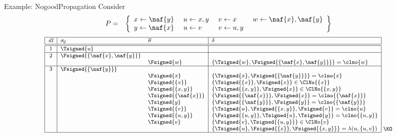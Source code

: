 \begin{frame}{Example: {NogoodPropagation}}
Consider
\begin{eqnarray*}
P
& = &
\left\{
  \begin{array}{l}
x  \leftarrow  \naf{y}\\%
y  \leftarrow  \naf{x}
\end{array}
\
\begin{array}{l}
u  \leftarrow x,y\\%
u  \leftarrow v%
\end{array}
\
\begin{array}{l}
v  \leftarrow x\\%
v  \leftarrow u,y%
\end{array}
\
\begin{array}{l}
w  \leftarrow \naf{x},\naf{y}\\
\mbox{~}
\end{array}
\right\}
\end{eqnarray*}
%
\[
\footnotesize
\begin{array}[b]{|c|ll|l|}
\hline
\mathit{dl}& \sigma_{\!d} & \overline{\sigma} & \delta
\\\hline\hline
1 & \Tsigned{u} & &
\\\hline
2 & \Fsigned{\{\naf{x},\naf{y}\}} & &
\\
  & & \Fsigned{w}     & \{\Tsigned{w},\Fsigned{\{\naf{x},\naf{y}\}}\}=\clno{w}
\\\hline
3 & \Fsigned{\{\naf{y}\}} & &
\\
  & & \Fsigned{x}     & \{\Tsigned{x},\Fsigned{\{\naf{y}\}}\}=\clno{x}
\\
  & & \Fsigned{\{x\}} & \{\Tsigned{\{x\}},\Fsigned{x}\}\in\ClNo{\{x\}}
\\
  & & \Fsigned{\{x,y\}} & \{\Tsigned{\{x,y\}},\Fsigned{x}\}\in\ClNo{\{x,y\}}
\\
  & & \Tsigned{\{\naf{x}\}} & \{\Fsigned{\{\naf{x}\}},\Fsigned{x}\}=\clno{\{\naf{x}\}}
\\
  & & \Tsigned{y} & \{\Fsigned{\{\naf{y}\}},\Fsigned{y}\}=\clno{\{\naf{y}\}}
\\
  & & \Tsigned{\{v\}} & \{\Tsigned{u},\Fsigned{\{x,y\}},\Fsigned\{v\}\}=\clno{u}
\\
  & & \Tsigned{\{u,y\}} & \{\Fsigned{\{u,y\}},\Tsigned{u},\Tsigned{y}\}=\clno{\{u,y\}}
\\
  & & \Tsigned{v} & \{\Fsigned{v},\Tsigned{\{u,y\}}\}\in\ClNo{v}
\\
  & & & \{\Tsigned{u},\Fsigned{\{x\}},\Fsigned{\{x,y\}}\}=\lambda(u,\{u,v\})
\\\hline
\end{array}
~\raisebox{1mm}{\KO}
\]
\end{frame}
